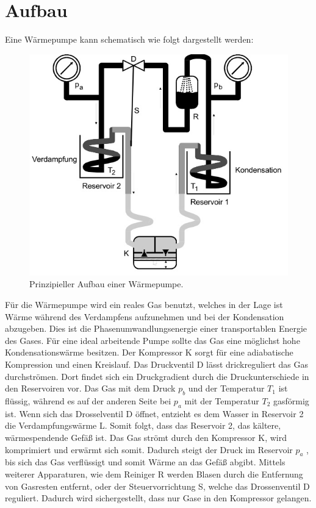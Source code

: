 \section{Aufbau}
\label{sec:Aufbau}
Eine Wärmepumpe kann schematisch wie folgt dargestellt werden:
\begin{figure}
  \centering
  \includegraphics{data/Abb1.jpg}
  \caption{Prinzipieller Aufbau einer Wärmepumpe. \cite{AnleitungV206}}
  \label{fig:Abb1}
\end{figure}
Für die Wärmepumpe wird ein reales Gas benutzt, welches in der Lage ist Wärme während des Verdampfens aufzunehmen und bei der Kondensation abzugeben.
Dies ist die Phasenumwandlungsenergie einer transportablen Energie des Gases.
Für eine ideal arbeitende Pumpe sollte das Gas eine möglichst hohe Kondensationswärme besitzen.
Der Kompressor K sorgt für eine adiabatische Kompression und einen Kreislauf.
Das Druckventil D lässt drickreguliert das Gas durchströmen.
Dort findet sich ein Druckgradient durch die Druckunterschiede in den Reservoiren vor.
Das Gas mit dem Druck $p_b$ und der Temperatur $T_1$ ist flüssig, 
während es auf der anderen Seite bei $p_a$ mit der Temperatur $T_2$ gasförmig ist. 
Wenn sich das Drosselventil D öffnet, entzieht es dem Wasser in Reservoir 2 die Verdampfungswärme L.
Somit folgt, dass das Reservoir 2, das kältere, wärmespendende Gefäß ist.
Das Gas strömt durch den Kompressor K, wird komprimiert und erwärmt sich somit.
Dadurch steigt der Druck im Reservoir $p_a$ , bis sich das Gas verflüssigt und somit Wärme an das Gefäß abgibt.
Mittels weiterer Apparaturen, wie dem Reiniger R werden Blasen durch die Entfernung von Gasresten entfernt,
oder der Steuervorrichtung S, welche das Drossenventil D reguliert. 
Dadurch wird sichergestellt, dass nur Gase in den Kompressor gelangen.